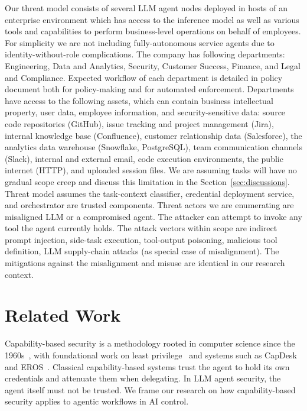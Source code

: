 \documentclass{article}
\theoremstyle{plain}
\theoremstyle{definition}
\theoremstyle{remark}
\begin{document}
Our threat model consists of several LLM agent nodes deployed in hosts of an enterprise environment which has access to the inference model as well as various tools and capabilities to perform business-level operations on behalf of employees. For simplicity we are not including fully-autonomous service agents due to identity-without-role complications. The company has following departments: Engineering, Data and Analytics, Security, Customer Success, Finance, and Legal and Compliance. Expected workflow of each department is detailed in policy document both for policy-making and for automated enforcement. Departments have access to the following assets, which can contain 
business intellectual property, user data, employee information, and 
security-sensitive data: source code repositories (GitHub), issue 
tracking and project management (Jira), internal knowledge base 
(Confluence), customer relationship data (Salesforce), the analytics 
data warehouse (Snowflake, PostgreSQL), team communication channels (Slack), 
internal and external email, code execution environments, the public 
internet (HTTP), and uploaded session files. We are assuming tasks will have no gradual scope creep and discuss this limitation in the Section~\ref{sec:discussions}. Threat model assumes the task-context classifier, credential deployment service, and orchestrator are trusted components. 
Threat actors we are enumerating are misaligned LLM or a compromised agent. The attacker can attempt to invoke any tool the agent currently holds. The attack vectors within scope are indirect prompt injection, side-task execution, tool-output poisoning, malicious tool definition, LLM supply-chain attacks (as special case of misalignment). The mitigations against the misalignment and misuse are identical in our research context.

\section{Related Work}

Capability-based security is a methodology rooted in computer science 
since the 1960s~\citep{dennis1966programming}, with foundational work on least 
privilege~\citep{saltzer1975protection} and systems such as 
CapDesk~\citep{miller2006robust} and EROS~\citep{shapiro1999eros}. 
Classical capability-based systems trust the agent to hold its own 
credentials and attenuate them when delegating. In LLM agent security, 
the agent itself must not be trusted. We frame our research on how 
capability-based security applies to agentic workflows in AI control.
\end{document}
